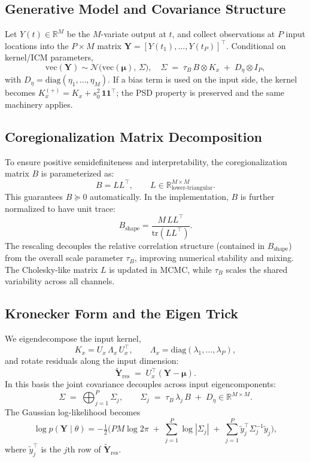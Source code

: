 \documentclass[11pt]{article}
\newcommand{\mat}[1]{\mathbf{#1}}
\newcommand{\cN}{\mathcal{N}}
\newcommand{\R}{\mathbb{R}}
\newcommand{\diag}{\text{diag}}
\begin{document}
\subsection{Generative Model and Covariance Structure}

Let $Y(t) \in \mathbb{R}^M$ be the $M$-variate output at $t$, and collect observations at $P$ input locations into the $P\times M$ matrix $\mat{Y}=[Y(t_1),\ldots,Y(t_P)]^\top$. Conditional on kernel/ICM parameters,
\[
\mathrm{vec}(\mat{Y}) \sim \cN\!\Big( \mathrm{vec}(\mat{\mu}),\, \Sigma \Big),
\quad
\Sigma \;=\; \tau_B\, B \otimes K_x \;+\; D_\eta \otimes I_P,
\]
with $D_\eta=\diag(\eta_1,\ldots,\eta_M)$. If a bias term is used on the input side, the kernel becomes $K_x^{(+)}=K_x + s_0^2\,\mathbf{1}\mathbf{1}^\top$; the PSD property is preserved and the same machinery applies.

\subsection{Coregionalization Matrix Decomposition}

To ensure positive semidefiniteness and interpretability, the coregionalization matrix $B$ is parameterized as:
\[
B = L L^\top, \qquad L \in \R^{M\times M}_{\text{lower-triangular}}.
\]
This guarantees $B\succeq 0$ automatically. In the implementation, $B$ is further normalized to have unit trace:
\[
B_{\text{shape}} = \frac{M\,L L^\top}{\mathrm{tr}(L L^\top)}.
\]
The rescaling decouples the relative correlation structure (contained in $B_{\text{shape}}$) from the overall scale parameter $\tau_B$, improving numerical stability and mixing. The Cholesky-like matrix $L$ is updated in MCMC, while $\tau_B$ scales the shared variability across all channels.

\subsection{Kronecker Form and the Eigen Trick}

We eigendecompose the input kernel,
\[
K_x = U_x\,\Lambda_x\,U_x^\top, \qquad \Lambda_x=\diag(\lambda_1,\ldots,\lambda_P),
\]
and rotate residuals along the input dimension:
\[
\widetilde{\mat{Y}}_{\mathrm{res}} \;=\; U_x^\top (\mat{Y}-\mat{\mu}).
\]
In this basis the joint covariance decouples across input eigencomponents:
\[
\Sigma \;=\; \bigoplus_{j=1}^P \Sigma_j, \qquad
\Sigma_j \;=\; \tau_B\,\lambda_j\, B \;+\; D_\eta \in \R^{M\times M}.
\]
The Gaussian log-likelihood becomes
\[
\log p(\mat{Y}\mid\theta)
= -\tfrac{1}{2}\Big(
  PM \log 2\pi \;+\; \sum_{j=1}^P \log|\Sigma_j|
  \;+\; \sum_{j=1}^P \widetilde{y}_j^\top \Sigma_j^{-1} \widetilde{y}_j
\Big),
\]
where $\widetilde{y}_j^\top$ is the $j$th row of $\widetilde{\mat{Y}}_{\mathrm{res}}$.
\end{document}
